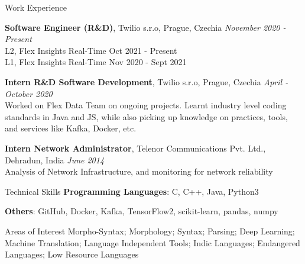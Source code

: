 \documentclass{resume}
\begin{document}
\begin{rSection}{Work Experience}

    {\textbf{Software Engineer (R\&D)}, Twilio s.r.o, Prague, Czechia}
        \hfill {\em November 2020 - Present}\\
            L2, Flex Insights Real-Time \hfill Oct 2021 - Present\\
            L1, Flex Insights Real-Time \hfill Nov 2020 - Sept 2021
            
    {\textbf{Intern R\&D Software Development}, Twilio s.r.o, Prague, Czechia}
        \hfill {\em April - October 2020}\\
            Worked on Flex Data Team on ongoing projects. Learnt industry level coding 
            standards in Java and JS, while also picking up knowledge on practices, tools, and services like Kafka, Docker, etc.

    {\textbf{Intern Network Administrator}, Telenor Communications Pvt. Ltd., Dehradun, India}
        \hfill {\em June 2014}\\
            Analysis of Network Infrastructure, and monitoring for 
            network reliability

\end{rSection}



\begin{rSection}{Technical Skills}
    {\textbf{Programming Languages}: C, C++, Java, Python3}
    
    {\textbf{Others}: GitHub, Docker, Kafka, TensorFlow2, scikit-learn, pandas, numpy}
    
    \begin{rSubsection}{Areas of Interest}{}{}{}
        Morpho-Syntax; Morphology; Syntax; Parsing; Deep Learning; Machine Translation; 
        Language Independent Tools; Indic Languages; Endangered Languages; Low Resource 
        Languages
    \end{rSubsection}
\end{rSection}

\end{document}
